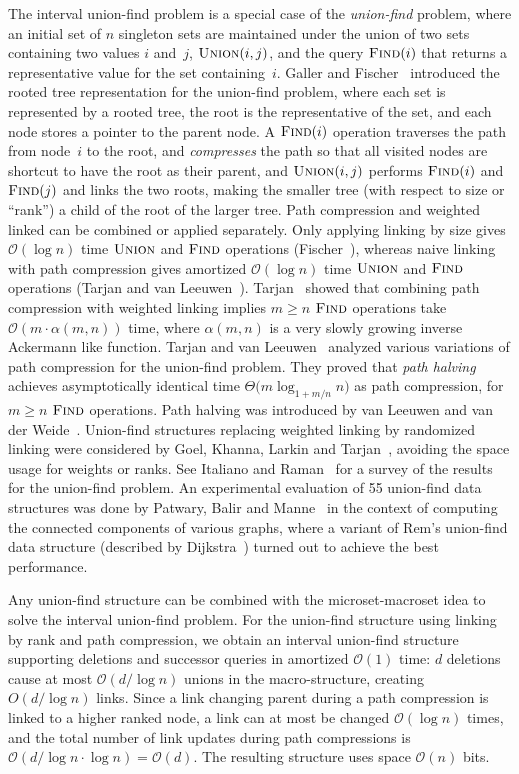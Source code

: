 \documentclass[a4paper]{lipics-v2021}
\newcommand{\Oh}{\mathcal{O}}
\newcommand{\FuncName}[1]{\textup{\textsc{#1}}}
\newcommand{\Union}{\FuncName{Union}}
\newcommand{\Find}{\FuncName{Find}}
\begin{document}
The interval union-find problem is a special case of the \emph{union-find} problem, where an initial set of $n$ singleton sets are maintained under the union of two sets containing two values $i$ and~$j$, $\Union(i, j)$, and the query $\Find(i)$ that returns a representative value for the set containing~$i$. Galler and Fischer~\cite{GallerFischer64} introduced the rooted tree representation for the union-find problem, where each set is represented by a rooted tree, the root is the representative of the set, and each node stores a pointer to the parent node. A $\Find(i)$ operation traverses the path from node~$i$ to the root, and \emph{compresses} the path so that all visited nodes are shortcut to have the root as their parent, and $\Union(i,j)$ performs $\Find(i)$ and $\Find(j)$ and links the two roots, making the smaller tree (with respect to size or ``rank'') a child of the root of the larger tree. Path compression and weighted linked can be combined or applied separately. Only applying linking by size gives $\Oh(\log n)$ time $\Union$ and $\Find$ operations (Fischer~\cite{Fischer72}), whereas naive linking with path compression gives amortized $\Oh(\log n)$ time $\Union$ and $\Find$ operations (Tarjan and van Leeuwen~\cite[Theorem~4]{TarjanLeeuwen84}). Tarjan~\cite{Tarjan75} showed that combining path compression with weighted linking implies $m \geq n$ $\Find$ operations take $\Oh(m\cdot\alpha(m, n))$ time, where $\alpha(m, n)$ is a very slowly growing inverse Ackermann like function. Tarjan and van Leeuwen~\cite{TarjanLeeuwen84} analyzed various variations of path compression for the union-find problem. They proved that \emph{path halving} achieves asymptotically identical time $\Theta\bigl(m\log_{1+m/n} n\bigr)$ as path compression, for $m \geq n$ $\Find$ operations. Path halving was introduced by van Leeuwen and van der Weide~\cite{Weide80,LeeuwenWeide77}. Union-find structures replacing weighted linking by randomized linking were considered by Goel, Khanna, Larkin and Tarjan~\cite{GoelKLT14}, avoiding the space usage for weights or ranks. See Italiano and Raman~\cite[Chapter~4.2]{ItalianoRaman99} for a survey of the results for the union-find problem. An experimental evaluation of 55 union-find data structures was done by Patwary, Balir and Manne~\cite{PatwaryBM10} in the context of computing the connected components of various graphs, where a variant of Rem's union-find data structure (described by Dijkstra~\cite[Chapter~23]{Dijkstra76}) turned out to achieve the best performance.

Any union-find structure can be combined with the microset-macroset idea to solve the interval union-find problem. For the union-find structure using linking by rank and path compression, we obtain an interval union-find structure supporting deletions and successor queries in amortized $\Oh(1)$ time: $d$ deletions cause at most $\Oh(d/\log n)$ unions in the macro-structure, creating $O(d/\log n)$ links. Since a link changing parent during a path compression is linked to a higher ranked node, a link can at most be changed $\Oh(\log n)$ times, and the total number of link updates during path compressions is $\Oh(d/\log n\cdot \log n)=\Oh(d)$. The resulting structure uses space $\Oh(n)$ bits.
\end{document}
